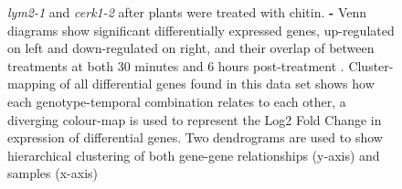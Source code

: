 \documentclass[../main.tex]{subfiles}
\begin{document}
\begin{figure}[!t]
{    \textit{lym2-1} and \textit{cerk1-2} after plants were treated
    with chitin. \textbf{\protect{} -
      \protect{}} Venn diagrams show significant
    differentially expressed genes, up-regulated on left and
    down-regulated on right, and their overlap of between treatments
    at both 30 minutes \textbf{\protect{}} and 6
    hours post-treatment
    \textbf{\protect{}}. \textbf{\protect{}}
    Cluster-mapping of all differential genes found in this data set
    shows how each genotype-temporal combination relates to each
    other, a diverging colour-map is used to represent the Log2 Fold
    Change in expression of differential genes. Two dendrograms are
    used to show hierarchical clustering of both gene-gene
    relationships (y-axis) and samples (x-axis)}
\end{figure}







\end{document}
